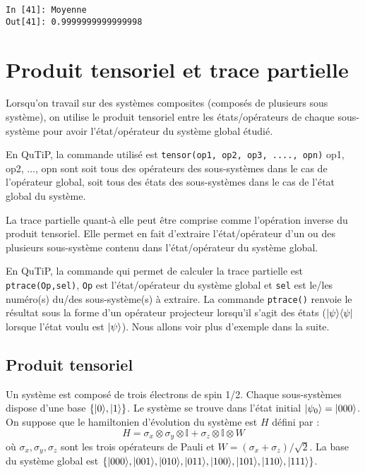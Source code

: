 \begin{itemize}
\begin{example}
\begin{lstlisting}
In [41]: Moyenne
Out[41]: 0.9999999999999998
\end{lstlisting}
\end{example}

\section{Produit tensoriel et trace partielle}

Lorsqu'on travail sur des systèmes composites (composés de plusieurs sous 
système), on utilise le produit tensoriel entre les états/opérateurs de chaque 
sous-système pour avoir l'état/opérateur du système global étudié.

En QuTiP, la commande utilisé est \texttt{tensor(op1, op2, op3, ...., opn)} 
op1, op2, ..., opn sont soit tous des opérateurs des sous-systèmes dans le cas 
de l'opérateur global, soit tous des états des sous-systèmes dans le cas de 
l'état global du système.

La trace partielle quant-à elle peut être comprise comme l'opération inverse du 
produit tensoriel. Elle permet en fait d'extraire l'état/opérateur d'un ou des 
plusieurs sous-système contenu dans l'état/opérateur du système global.

En QuTiP, la commande qui permet de calculer la trace partielle est 
\texttt{ptrace(Op,sel)}, \texttt{Op} est l'état/opérateur du système global et 
\texttt{sel} est le/les numéro(s) du/des sous-système(s) à extraire. La 
commande \texttt{ptrace()} renvoie le résultat sous la forme d'un opérateur 
projecteur lorsqu'il s'agit des états ($\vert\psi\rangle\langle\psi\vert$ lorsque l'état 
voulu est $\vert\psi\rangle$). Nous allons voir plus d'exemple dans la suite.
\subsection{Produit tensoriel} \label{tensor}
Un système est composé de trois électrons de spin 1/2. Chaque sous-systèmes 
dispose d'une base $\{\vert0\rangle,\vert1\rangle\}$. Le système se trouve dans l'état 
initial $\vert\psi_0\rangle=\vert000\rangle$. On suppose que le hamiltonien d'évolution du 
système est $H$ défini par :
\begin{equation}
H = \sigma_x\otimes\sigma_y\otimes\mathbb{I}+\sigma_z\otimes\mathbb{I}\otimes W
\end{equation}
où $\sigma_x,\sigma_y,\sigma_z$ sont les trois opérateurs de Pauli et 
$W=(\sigma_x+\sigma_z)/\sqrt{2}$. La base du système global est 
$\{\vert000\rangle,\vert001\rangle,\vert010\rangle,\vert011\rangle,\vert100\rangle,\vert101\rangle,\vert110\rangle,\vert
111\rangle\}$.


\end{itemize}
